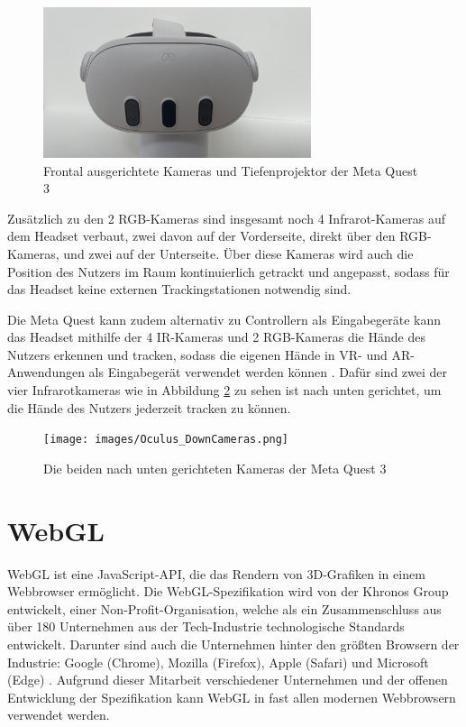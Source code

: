 \begin{figure}[H]
  \centering
  \includegraphics[width=0.7\textwidth]{images/Oculus-FrontCameras.jpg}
  \caption{Frontal ausgerichtete Kameras und Tiefenprojektor der Meta Quest 3}
  \label{fig:quest-front-cameras}
\end{figure}

Zusätzlich zu den 2 RGB-Kameras sind insgesamt noch 4 Infrarot-Kameras auf dem Headset verbaut, zwei davon auf der Vorderseite, direkt über den RGB-Kameras, und zwei auf der Unterseite.
Über diese Kameras wird auch die Position des Nutzers im Raum kontinuierlich getrackt und angepasst, sodass für das Headset keine externen Trackingstationen notwendig sind.

Die Meta Quest kann zudem alternativ zu Controllern als Eingabegeräte kann das Headset mithilfe der 4 IR-Kameras und 2 RGB-Kameras die Hände des Nutzers erkennen und tracken, sodass die eigenen Hände in VR- und AR-Anwendungen als Eingabegerät verwendet werden können \autocite[]{meta-quest-3}.
Dafür sind zwei der vier Infrarotkameras wie in Abbildung \ref{fig:quest-hand-cameras} zu sehen ist nach unten gerichtet, um die Hände des Nutzers jederzeit tracken zu können.

\begin{figure}[H]
  \centering
  \texttt{[image: images/Oculus\_DownCameras.png]}
  \caption{Die beiden nach unten gerichteten Kameras der Meta Quest 3}
  \label{fig:quest-hand-cameras}
\end{figure}


\section{WebGL}

WebGL ist eine JavaScript-API, die das Rendern von 3D-Grafiken in einem Webbrowser ermöglicht.
Die WebGL-Spezifikation wird von der Khronos Group entwickelt, einer Non-Profit-Organisation, welche als ein Zusammenschluss aus über 180 Unternehmen aus der Tech-Industrie technologische Standards entwickelt.
Darunter sind auch die Unternehmen hinter den größten Browsern der Industrie: Google (Chrome), Mozilla (Firefox), Apple (Safari) und Microsoft (Edge) \autocite[]{khronos-webgl, khronos-about}.
Aufgrund dieser Mitarbeit verschiedener Unternehmen und der offenen Entwicklung der Spezifikation kann WebGL in fast allen modernen Webbrowsern verwendet werden.

